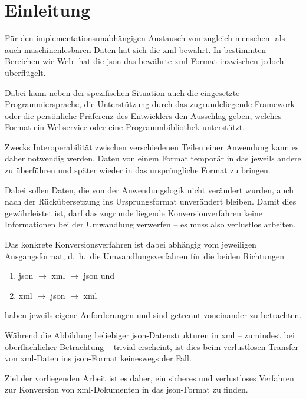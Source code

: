 \chapter{Einleitung} \label{chap:intro}

Für den implementationsunabhängigen Austausch von zugleich menschen- als auch
maschinenlesbaren Daten hat sich die \gls{xml}
bewährt. In bestimmten Bereichen wie Web- hat die \gls{json}
das bewährte \acrshort{xml}-Format inzwischen jedoch überflügelt.

Dabei kann neben der spezifischen Situation auch die eingesetzte
Programmiersprache, die Unterstützung durch das zugrundeliegende Framework
oder die persönliche Präferenz des Entwicklers den Ausschlag geben, welches
Format ein Webservice oder eine Programmbibliothek unterstützt.

Zwecks Interoperabilität zwischen verschiedenen Teilen einer Anwendung kann es
daher notwendig werden, Daten von einem Format temporär in das jeweils andere
zu überführen und später wieder in das ursprüngliche Format zu bringen.

Dabei sollen Daten, die von der Anwendungslogik nicht verändert wurden, auch
nach der Rückübersetzung ins Ursprungsformat unverändert bleiben. Damit dies
gewährleistet ist, darf das zugrunde liegende Konversionverfahren keine
Informationen bei der Umwandlung verwerfen -- es muss also verlustlos %
arbeiten.

Das konkrete Konversionsverfahren ist dabei abhängig vom jeweiligen
Ausgangsformat, d.~h.\ die Umwandlungsverfahren für die beiden Richtungen
\begin{enumerate}
    \item \acrshort{json} $\rightarrow$ \acrshort{xml} $\rightarrow$ \acrshort{json} und
    \item \acrshort{xml} $\rightarrow$ \acrshort{json} $\rightarrow$ \acrshort{xml}
\end{enumerate}
haben jeweils eigene Anforderungen und sind getrennt voneinander zu betrachten.

Während die Abbildung beliebiger \acrshort{json}-Datenstrukturen in \acrshort{xml} -- zumindest bei
oberflächlicher Betrachtung -- trivial erscheint, ist dies beim verlustlosen
Transfer von \acrshort{xml}-Daten ins \acrshort{json}-Format keineswegs der Fall.

Ziel der vorliegenden Arbeit ist es daher, ein sicheres und verlustloses
Verfahren zur Konversion von \acrshort{xml}-Dokumenten in das \acrshort{json}-Format zu finden.

